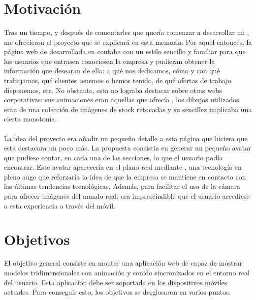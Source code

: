 \documentclass{subfiles}
\begin{document}
        \section{Motivación}
        \label{sec:motivacion}
        
        \paragraph{}
        {Tras un tiempo, y después de comentarles que quería comenzar a desarrollar mi \TFG, me ofrecieron el proyecto que se explicará en esta memoria. Por aquel entonces, la página web de \silverstorm desarrollada en \wordpress contaba con un estilo sencillo y familiar para que los usuarios que entrasen conociesen la empresa y pudieran obtener la información que desearan de ella: a qué nos dedicamos, cómo y con qué trabajamos, qué clientes tenemos o hemos tenido, de qué ofertas de trabajo disponemos, etc. No obstante, esta no lograba destacar sobre otras webs corporativas: sus animaciones eran aquellas que ofrecía \wordpress, los dibujos utilizados eran de una colección de imágenes de stock retocadas y su sencillez implicaba una cierta monotonía.}
        
        \paragraph{}
        {La idea del proyecto era añadir un pequeño detalle a esta página que hiciera que esta destacara un poco más. La propuesta consistía en generar un pequeño avatar que pudiese contar, en cada una de las secciones, lo que el usuario podía encontrar. Este avatar aparecería en el plano real mediante \ra, una tecnología en pleno auge \cite{Xiong2021} que reforzaría la idea de que la empresa se mantiene en contacto con las últimas tendencias tecnológicas. Además, para facilitar el uso de la cámara para ofrecer imágenes del mundo real, era imprescindible que el usuario accediese a esta experiencia a través del móvil.}

        \section{Objetivos}
        \label{sec:objetivos}
        {El objetivo general consiste en montar una aplicación web de \ra capaz de mostrar modelos tridimensionales con animación y sonido sincronizados en el entorno real del usuario. Esta aplicación debe ser soportada en los dispositivos móviles actuales. Para conseguir esto, los objetivos se desglosaron en varios puntos.}
\end{document}
